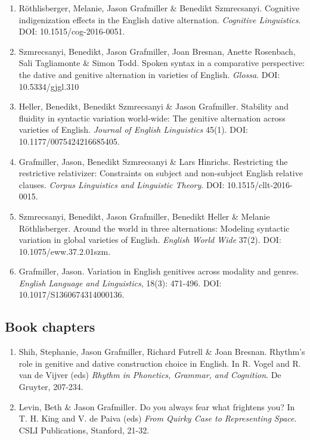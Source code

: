 \documentclass[11pt,]{article}
\begin{document}
\begin{enumerate}
\def\labelenumi{\arabic{enumi}.}
\setcounter{enumi}{2016}
\item
  Röthlisberger, Melanie, Jason Grafmiller \& Benedikt Szmrecsanyi.
  Cognitive indigenization effects in the English dative alternation.
  \emph{Cognitive Linguistics}. DOI: 10.1515/cog-2016-0051.
\item
  Szmrecsanyi, Benedikt, Jason Grafmiller, Joan Bresnan, Anette
  Rosenbach, Sali Tagliamonte \& Simon Todd. Spoken syntax in a
  comparative perspective: the dative and genitive alternation in
  varieties of English. \emph{Glossa}. DOI: 10.5334/gjgl.310
\item
  Heller, Benedikt, Benedikt Szmrecsanyi \& Jason Grafmiller. Stability
  and fluidity in syntactic variation world-wide: The genitive
  alternation across varieties of English. \emph{Journal of English
  Linguistics} 45(1). DOI: 10.1177/0075424216685405.
\item
  Grafmiller, Jason, Benedikt Szmrecsanyi \& Lars Hinrichs. Restricting
  the restrictive relativizer: Constraints on subject and non-subject
  English relative clauses. \emph{Corpus Linguistics and Linguistic
  Theory}. DOI: 10.1515/cllt-2016-0015.
\item
  Szmrecsanyi, Benedikt, Jason Grafmiller, Benedikt Heller \& Melanie
  Röthlisberger. Around the world in three alternations: Modeling
  syntactic variation in global varieties of English. \emph{English
  World Wide} 37(2). DOI: 10.1075/eww.37.2.01szm.
\item
  Grafmiller, Jason. Variation in English genitives across modality and
  genres. \emph{English Language and Linguistics}, 18(3): 471-496. DOI:
  10.1017/S1360674314000136.
\end{enumerate}

\subsection{Book chapters}\label{book-chapters}

\begin{enumerate}
\def\labelenumi{\arabic{enumi}.}
\setcounter{enumi}{2014}
\item
  Shih, Stephanie, Jason Grafmiller, Richard Futrell \& Joan Bresnan.
  Rhythm's role in genitive and dative construction choice in English.
  In R. Vogel and R. van de Vijver (eds) \emph{Rhythm in Phonetics,
  Grammar, and Cognition}. De Gruyter, 207-234.
\item
  Levin, Beth \& Jason Grafmiller. Do you always fear what frightens
  you? In T. H. King and V. de Paiva (eds) \emph{From Quirky Case to
  Representing Space}. CSLI Publications, Stanford, 21-32.
\end{enumerate}
\end{document}
